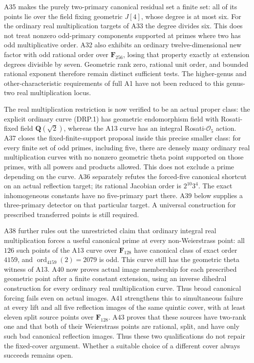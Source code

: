 A35 makes the purely two-primary canonical residual set a finite set:
all of its points lie over the field fixing geometric $J[4]$, whose degree
is at most six. For the ordinary real multiplication targets of A33 the
degree divides six. This does not treat nonzero odd-primary components
supported at primes where two has odd multiplicative order. A32 also
exhibits an ordinary twelve-dimensional new factor with odd rational
order over $\mathbf F_{256}$, losing that property exactly at extension
degrees divisible by seven. Geometric rank zero, rational unit order,
and bounded rational exponent therefore remain distinct sufficient tests.
The higher-genus and other-characteristic requirements of full A1 have
not been reduced to this genus-two real multiplication locus.


The real multiplication restriction is now verified to be an actual
proper class: the explicit ordinary curve (DRP.1) has geometric
endomorphism field with Rosati-fixed field $\mathbf Q(\sqrt2)$,
whereas the A13 curve has an integral Rosati-$\mathcal O_5$ action.
A37 closes the fixed-finite-support proposal inside this precise
smaller class: for every finite set of odd primes, including five,
there are densely many ordinary real multiplication curves with no
nonzero geometric theta point supported on those primes, with all
powers and products allowed. This does not exclude a prime depending
on the curve. A36 separately refutes the forced-five canonical
shortcut on an actual reflection target; its rational Jacobian order
is $2^{10}3^4$. The exact inhomogeneous constants have no five-primary
part there. A39 below supplies a three-primary detector on that particular target.
A universal construction for prescribed transferred points is still required.

A38 further rules out the unrestricted claim that ordinary
integral real multiplication forces a useful canonical prime at every
non-Weierstrass point: all $126$ such points of the A13 curve over
$\mathbf F_{128}$ have canonical class of exact order $4159$, and
$\operatorname{ord}_{4159}(2)=2079$ is odd. This curve still has the
geometric theta witness of A13. A40 now proves actual image membership for each prescribed geometric
point after a finite constant extension, using an inverse dihedral
construction for every ordinary real multiplication curve. Thus broad
canonical forcing fails even on actual images. A41 strengthens this to simultaneous failure at every lift and all
five reflection images of the same quintic cover, with at least eleven
split source points over $\mathbf F_{128}$. A43 proves that these
sources have two-rank one and that both of their Weierstrass points are
rational, split, and have only such bad canonical reflection images.
Thus these two qualifications do not repair the fixed-cover argument.
Whether a suitable choice of a different cover always succeeds remains open.


